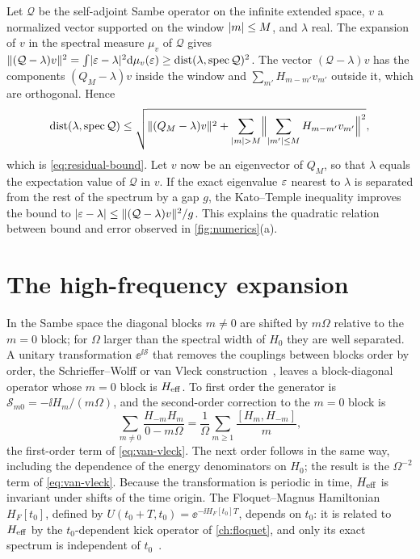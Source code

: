 Let $\mathcal Q$ be the self-adjoint Sambe operator on the infinite extended space, $v$ a
normalized vector supported on the window $\lvert m\rvert\le M$, and $\lambda$ real. The expansion of
$v$ in the spectral measure $\mu_v$ of $\mathcal Q$ gives
$\lVert (\mathcal Q-\lambda)v\rVert^2=\int\lvert \varepsilon-\lambda\rvert^2\mathrm{d}\mu_v(\varepsilon)\ge\operatorname{dist}(\lambda,\operatorname{spec}\mathcal Q)^2$.
The vector $(\mathcal Q-\lambda)v$ has the components $(Q_M-\lambda)v$ inside the window and
$\sum_{m'}H_{m-m'}v_{m'}$ outside it, which are orthogonal. Hence
\begin{equation}
  \operatorname{dist}(\lambda,\operatorname{spec}\mathcal Q)\le\sqrt{\lVert (Q_M-\lambda)v\rVert^2+\sum_{\lvert m\rvert>M}\Bigl\lVert\sum_{\lvert m'\rvert\le M}H_{m-m'}v_{m'}\Bigr\rVert^2},
\end{equation}
which is \cref{eq:residual-bound}. Let $v$ now be an eigenvector of $Q_M$, so that $\lambda$
equals the expectation value of $\mathcal Q$ in $v$. If the exact eigenvalue $\varepsilon$ nearest to
$\lambda$ is separated from the rest of the spectrum by a gap $g$, the Kato--Temple
inequality improves the bound to $\lvert \varepsilon-\lambda\rvert\le\lVert (\mathcal Q-\lambda)v\rVert^2/g$. This
explains the quadratic relation between bound and error observed in \cref{fig:numerics}(a).

\section{The high-frequency expansion}\label{app:vanvleck}

In the Sambe space the diagonal blocks $m\ne0$ are shifted by $m\Omega$ relative to the
$m=0$ block; for $\Omega$ larger than the spectral width of $H_0$ they are well separated. A
unitary transformation $\ee^{\ii\mathcal S}$
that removes the couplings between blocks order by order, the Schrieffer--Wolff or van Vleck
construction~\cite{vanvleck1929sigma,shavitt1980quasidegenerate,bravyi2011schrieffer,eckardt2015high},
leaves a block-diagonal operator whose $m=0$ block is $H_{\mathrm{eff}}$. To first order the generator
is $\mathcal S_{m0}=-\ii H_m/(m\Omega)$, and the second-order correction to the $m=0$ block
is
\begin{equation}
  \sum_{m\ne0}\frac{H_{-m}H_m}{0-m\Omega}=\frac1\Omega\sum_{m\ge1}\frac{[H_m,H_{-m}]}m ,
\end{equation}
the first-order term of \cref{eq:van-vleck}. The next order follows in the same way,
including the dependence of the energy denominators on $H_0$; the result is the
$\Omega^{-2}$ term of \cref{eq:van-vleck}. Because the transformation is periodic in time,
$H_{\mathrm{eff}}$ is invariant under shifts of the time origin. The Floquet--Magnus Hamiltonian
$H_F[t_0]$, defined by $U(t_0+T,t_0)=\ee^{-\ii H_F[t_0]T}$, depends on $t_0$: it is related to $H_{\mathrm{eff}}$ by
the $t_0$-dependent kick operator of \cref{ch:floquet}, and only its exact spectrum is
independent of $t_0$~\cite{bukov2015universal,goldman2014periodically}.

